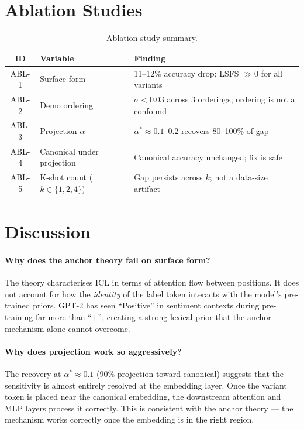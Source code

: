 \documentclass[11pt,a4paper]{article}
\begin{document}
\section{Ablation Studies}

\begin{table}[h]
\centering
\small
\begin{tabular}{clp{6.5cm}}
\toprule
\textbf{ID} & \textbf{Variable} & \textbf{Finding} \\
\midrule
ABL-1 & Surface form    &
  11--12\% accuracy drop; LSFS $\gg 0$ for all variants \\
ABL-2 & Demo ordering   &
  $\sigma < 0.03$ across 3 orderings; ordering is not
  a confound \\
ABL-3 & Projection $\alpha$ &
  $\alpha^* \approx 0.1$--$0.2$ recovers 80--100\% of gap \\
ABL-4 & Canonical under projection &
  Canonical accuracy unchanged; fix is safe \\
ABL-5 & K-shot count ($k \in \{1,2,4\}$) &
  Gap persists across $k$; not a data-size artifact \\
\bottomrule
\end{tabular}
\caption{Ablation study summary.}
\label{tab:ablations}
\end{table}

\section{Discussion}

\paragraph{Why does the anchor theory fail on surface form?}
The theory characterises ICL in terms of attention flow
between positions. It does not account for how the
\emph{identity} of the label token interacts with the model's
pre-trained priors. GPT-2 has seen ``Positive'' in sentiment
contexts during pre-training far more than ``+'', creating
a strong lexical prior that the anchor mechanism alone
cannot overcome.

\paragraph{Why does projection work so aggressively?}
The recovery at $\alpha^* \approx 0.1$ (90\% projection toward
canonical) suggests that the sensitivity is almost entirely
resolved at the embedding layer. Once the variant token
is placed near the canonical embedding, the downstream
attention and MLP layers process it correctly. This is
consistent with the anchor theory — the mechanism works
correctly once the embedding is in the right region.
\end{document}
